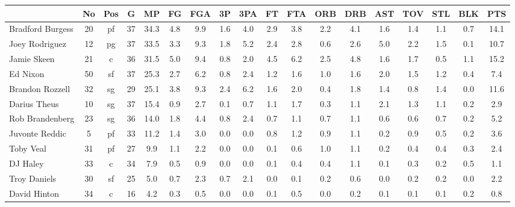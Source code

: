 \documentclass[10pt,letterpaper]{article}
\begin{document}
\begin{table}[ht]
\begin{center}
\begin{tabular}{lccccccccccccccccc}
  \hline
 & No & Pos & G & MP & FG & FGA & 3P & 3PA & FT & FTA & ORB & DRB & AST & TOV & STL & BLK & PTS \\ 
  \hline
Bradford Burgess & 20 & pf & 37 & 34.3 & 4.8 & 9.9 & 1.6 & 4.0 & 2.9 & 3.8 & 2.2 & 4.1 & 1.6 & 1.4 & 1.1 & 0.7 & 14.1 \\ 
  Joey Rodriguez & 12 & pg & 37 & 33.5 & 3.3 & 9.3 & 1.8 & 5.2 & 2.4 & 2.8 & 0.6 & 2.6 & 5.0 & 2.2 & 1.5 & 0.1 & 10.7 \\ 
  Jamie Skeen & 21 & c & 36 & 31.5 & 5.0 & 9.4 & 0.8 & 2.0 & 4.5 & 6.2 & 2.5 & 4.8 & 1.6 & 1.7 & 0.5 & 1.1 & 15.2 \\ 
  Ed Nixon & 50 & sf & 37 & 25.3 & 2.7 & 6.2 & 0.8 & 2.4 & 1.2 & 1.6 & 1.0 & 1.6 & 2.0 & 1.5 & 1.2 & 0.4 & 7.4 \\ 
  Brandon Rozzell & 32 & sg & 29 & 25.1 & 3.8 & 9.3 & 2.4 & 6.2 & 1.6 & 2.0 & 0.4 & 1.8 & 1.4 & 0.8 & 1.4 & 0.0 & 11.6 \\ 
  Darius Theus & 10 & sg & 37 & 15.4 & 0.9 & 2.7 & 0.1 & 0.7 & 1.1 & 1.7 & 0.3 & 1.1 & 2.1 & 1.3 & 1.1 & 0.2 & 2.9 \\ 
  Rob Brandenberg & 23 & sg & 36 & 14.0 & 1.8 & 4.4 & 0.8 & 2.4 & 0.7 & 1.1 & 0.7 & 1.1 & 0.6 & 0.6 & 0.7 & 0.2 & 5.2 \\ 
  Juvonte Reddic & 5 & pf & 33 & 11.2 & 1.4 & 3.0 & 0.0 & 0.0 & 0.8 & 1.2 & 0.9 & 1.1 & 0.2 & 0.9 & 0.5 & 0.2 & 3.6 \\ 
  Toby Veal & 31 & pf & 27 & 9.9 & 1.1 & 2.2 & 0.0 & 0.0 & 0.1 & 0.6 & 1.0 & 1.1 & 0.2 & 0.4 & 0.4 & 0.3 & 2.4 \\ 
  DJ Haley & 33 & c & 34 & 7.9 & 0.5 & 0.9 & 0.0 & 0.0 & 0.1 & 0.4 & 0.4 & 1.1 & 0.1 & 0.3 & 0.2 & 0.5 & 1.1 \\ 
  Troy Daniels & 30 & sf & 25 & 5.0 & 0.7 & 2.3 & 0.7 & 2.1 & 0.0 & 0.1 & 0.2 & 0.6 & 0.0 & 0.2 & 0.2 & 0.0 & 2.2 \\ 
  David Hinton & 34 & c & 16 & 4.2 & 0.3 & 0.5 & 0.0 & 0.0 & 0.1 & 0.5 & 0.0 & 0.2 & 0.1 & 0.1 & 0.1 & 0.2 & 0.8 \\ 
   \hline
\end{tabular}
\end{center}
\end{table}
\end{document}
